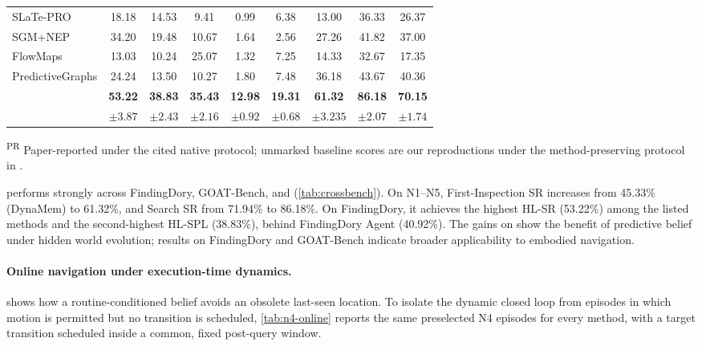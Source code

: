 \begin{table}[!htbp]
{\begin{tabular}{lcccccccc}
SLaTe-PRO \citep{patel2023routine} & 18.18 & 14.53 & 9.41 & 0.99 & 6.38 & 13.00 & 36.33 & 26.37\\
SGM+NEP \citep{kurenkov2023dynamic} & 34.20 & 19.48 & 10.67 & 1.64 & 2.56 & 27.26 & 41.82 & 37.00\\
FlowMaps \citep{argenziano2026flowmaps} & 13.03 & 10.24 & 25.07 & 1.32 & 7.25 & 14.33 & 32.67 & 17.35\\
PredictiveGraphs \citep{saavedraruiz2026predictivegraphs} & 24.24 & 13.50 & 10.27 & 1.80 & 7.48 & 36.18 & 43.67 & 40.36\\
\midrule
\rowcolor{tblours} & \textbf{53.22} & \textbf{38.83} &
\textbf{35.43} & \textbf{12.98} & \textbf{19.31} & \textbf{61.32} &
\textbf{86.18} & \textbf{70.15}\\
\rowcolor{tblours}\multirow{-2}{*}{\textbf{\evolvingworldnav{} (ours)}} & $\pm 3.87$ & $\pm 2.43$ & $\pm 2.16$ &
$\pm 0.92$ & $\pm 0.68$ & $\pm 3.235$ & $\pm 2.07$ & $\pm 1.74$\\
\bottomrule
\end{tabular}
}
\vspace{1pt}

\parbox{\textwidth}{\scriptsize
\textsuperscript{PR} Paper-reported under the cited native protocol; unmarked
baseline scores are our reproductions under the method-preserving protocol in
.}
\end{table}

\evolvingworldnav{} performs strongly across FindingDory, GOAT-Bench, and
\evolvingworldbench{} (\cref{tab:crossbench}). On \evolvingworldbench{} N1--N5,
First-Inspection SR increases from 45.33\% (DynaMem) to 61.32\%, and Search SR
from 71.94\% to 86.18\%. On FindingDory, it achieves the highest HL-SR
(53.22\%) among the listed methods and the second-highest HL-SPL (38.83\%),
behind FindingDory Agent (40.92\%). The gains on \evolvingworldbench{} show the benefit of predictive belief under
hidden world evolution; results on FindingDory and GOAT-Bench indicate broader
applicability to embodied navigation.

\paragraph{Online navigation under execution-time dynamics.}
 shows how a routine-conditioned belief avoids an
obsolete last-seen location. To isolate the dynamic closed loop from episodes
in which motion is permitted but no transition is scheduled, \cref{tab:n4-online}
reports the same preselected N4 episodes for every method, with a target
transition scheduled inside a common, fixed post-query window.

